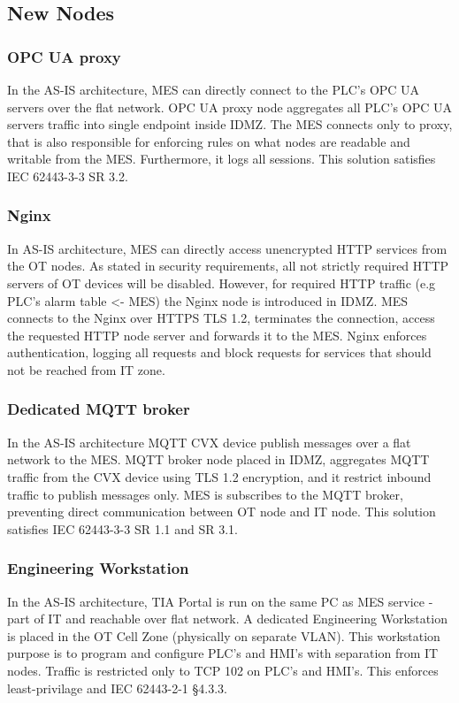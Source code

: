 \subsection{New Nodes}
\subsubsection{OPC UA proxy}
In the AS-IS architecture, MES can directly connect to the PLC's OPC UA servers over the flat network.
OPC UA proxy node aggregates all PLC's OPC UA servers traffic into single endpoint inside IDMZ.
The MES connects only to proxy, that is also responsible for enforcing rules on 
what nodes are readable and writable from the MES. Furthermore, it logs all sessions.
This solution satisfies IEC 62443-3-3 SR 3.2.
\subsubsection{Nginx}
In AS-IS architecture, MES can directly access unencrypted HTTP services from the OT nodes.
As stated in security requirements, all not strictly required HTTP servers of OT devices will be 
disabled. However, for required HTTP traffic (e.g PLC's alarm table <- MES) the Nginx node is
introduced in IDMZ. MES connects to the Nginx over HTTPS TLS 1.2, terminates the connection, access
the requested HTTP node server and forwards it to the MES. Nginx enforces authentication,
logging all requests and block requests for services that should not be reached from IT zone.
\subsubsection{Dedicated MQTT broker}
In the AS-IS architecture MQTT CVX device publish messages over a flat network to the MES.
MQTT broker node placed in IDMZ, aggregates MQTT traffic from the CVX device using TLS 1.2 encryption,
and it restrict inbound traffic to publish messages only. MES is subscribes to the
MQTT broker, preventing direct communication between OT node and IT node. This solution
satisfies IEC 62443-3-3 SR 1.1 and SR 3.1.
\subsubsection{Engineering Workstation}
In the AS-IS architecture, TIA Portal is run on the same PC as MES service - part of IT and reachable over flat network.
A dedicated Engineering Workstation is placed in the OT Cell Zone (physically on separate VLAN).
This workstation purpose is to program and configure PLC's and HMI's with separation
from IT nodes. Traffic is restricted only to TCP 102 on PLC's and HMI's. This enforces
least-privilage and IEC 62443-2-1 §4.3.3.
